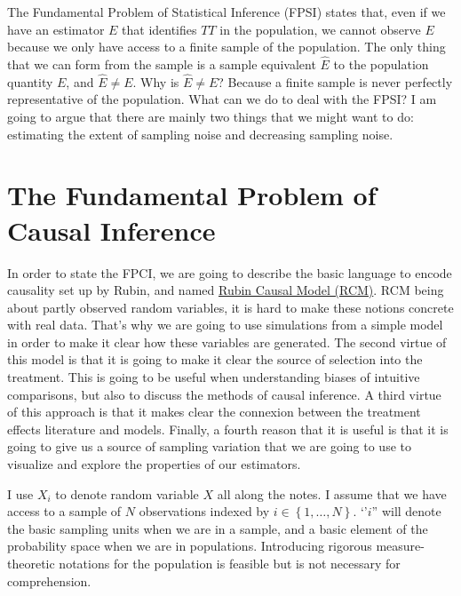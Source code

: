 \documentclass[]{book}
\theoremstyle{definition}
\theoremstyle{definition}
\theoremstyle{definition}
\theoremstyle{remark}
\begin{document}
The Fundamental Problem of Statistical Inference (FPSI) states that,
even if we have an estimator \(E\) that identifies \(TT\) in the
population, we cannot observe \(E\) because we only have access to a
finite sample of the population. The only thing that we can form from
the sample is a sample equivalent \(\hat{E}\) to the population quantity
\(E\), and \(\hat{E}\neq E\). Why is \(\hat{E}\neq E\)? Because a finite
sample is never perfectly representative of the population. What can we
do to deal with the FPSI? I am going to argue that there are mainly two
things that we might want to do: estimating the extent of sampling noise
and decreasing sampling noise.

\chapter{The Fundamental Problem of Causal
Inference}\label{the-fundamental-problem-of-causal-inference}

In order to state the FPCI, we are going to describe the basic language
to encode causality set up by Rubin, and named \href{RCM.html}{Rubin
Causal Model (RCM)}. RCM being about partly observed random variables,
it is hard to make these notions concrete with real data. That's why we
are going to use simulations from a simple model in order to make it
clear how these variables are generated. The second virtue of this model
is that it is going to make it clear the source of selection into the
treatment. This is going to be useful when understanding biases of
intuitive comparisons, but also to discuss the methods of causal
inference. A third virtue of this approach is that it makes clear the
connexion between the treatment effects literature and models. Finally,
a fourth reason that it is useful is that it is going to give us a
source of sampling variation that we are going to use to visualize and
explore the properties of our estimators.

I use \(X_i\) to denote random variable \(X\) all along the notes. I
assume that we have access to a sample of \(N\) observations indexed by
\(i\in\left\{1,\dots,N\right\}\). `'\(i\)'' will denote the basic
sampling units when we are in a sample, and a basic element of the
probability space when we are in populations. Introducing rigorous
measure-theoretic notations for the population is feasible but is not
necessary for comprehension.
\end{document}
